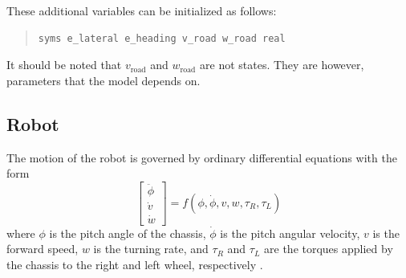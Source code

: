 \documentclass[12pt]{article}
\begin{document}
These additional variables can be initialized as follows:
\begin{quote}
\begin{lstlisting}
syms e_lateral e_heading v_road w_road real
\end{lstlisting}
\end{quote}
It should be noted that $v_\text{road}$ and $w_\text{road}$ are not states. They are however, parameters that the model depends on. 
\subsection{Robot}
\label{secRobot}
The motion of the robot is governed by ordinary differential equations with the form
\begin{equation}
\label{eqEOM}
\begin{bmatrix} \ddot{\phi} \\ \dot{v} \\ \dot{w} \end{bmatrix} = f(\phi,\dot{\phi},v,w,\tau_{R},\tau_{L})
\end{equation}
where $\phi$ is the pitch angle of the chassis, $\dot{\phi}$ is the pitch angular velocity, $v$ is the forward speed, $w$ is the turning rate, and $\tau_{R}$ and $\tau_{L}$ are the torques applied by the chassis to the right and left wheel, respectively \cite{mak}. 
\end{document}
